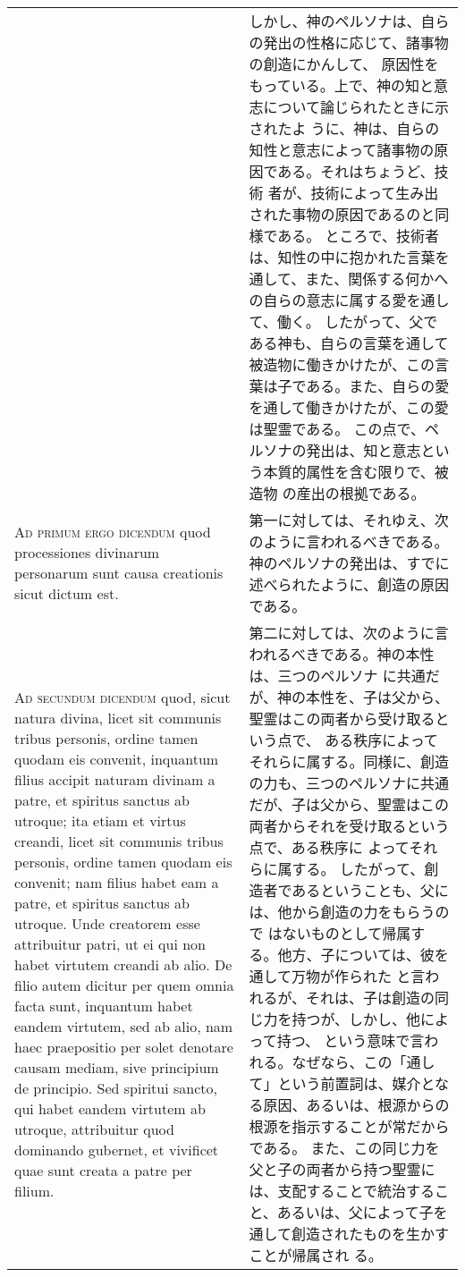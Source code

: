 \documentclass[10pt]{jsarticle} %
\begin{document}
\begin{longtable}{p{21em}p{21em}}
&

しかし、神のペルソナは、自らの発出の性格に応じて、諸事物の創造にかんして、
 原因性をもっている。上で、神の知と意志について論じられたときに示されたよ
 うに、神は、自らの知性と意志によって諸事物の原因である。それはちょうど、技術
 者が、技術によって生み出された事物の原因であるのと同様である。
ところで、技術者は、知性の中に抱かれた言葉を通して、また、関係する何かへ
 の自らの意志に属する愛を通して、働く。
したがって、父である神も、自らの言葉を通して被造物に働きかけたが、この言
 葉は子である。また、自らの愛を通して働きかけたが、この愛は聖霊である。
この点で、ペルソナの発出は、知と意志という本質的属性を含む限りで、被造物
 の産出の根拠である。


\\

{\scshape Ad primum ergo dicendum} quod processiones
divinarum personarum sunt causa creationis sicut dictum est.

&
第一に対しては、それゆえ、次のように言われるべきである。
神のペルソナの発出は、すでに述べられたように、創造の原因である。

\\


{\scshape Ad secundum dicendum} quod, sicut natura
divina, licet sit communis tribus personis, ordine tamen quodam eis
convenit, inquantum filius accipit naturam divinam a patre, et spiritus
sanctus ab utroque; ita etiam et virtus creandi, licet sit communis
tribus personis, ordine tamen quodam eis convenit; nam filius habet eam
a patre, et spiritus sanctus ab utroque. Unde creatorem esse attribuitur
patri, ut ei qui non habet virtutem creandi ab alio. De filio autem
dicitur per quem omnia facta sunt, inquantum habet eandem virtutem, sed
ab alio, nam haec praepositio per solet denotare causam mediam, sive
principium de principio. Sed spiritui sancto, qui habet eandem virtutem
ab utroque, attribuitur quod dominando gubernet, et vivificet quae sunt
creata a patre per filium. 

&

第二に対しては、次のように言われるべきである。神の本性は、三つのペルソナ
に共通だが、神の本性を、子は父から、聖霊はこの両者から受け取るという点で、
ある秩序によってそれらに属する。同様に、創造の力も、三つのペルソナに共通
だが、子は父から、聖霊はこの両者からそれを受け取るという点で、ある秩序に
よってそれらに属する。
したがって、創造者であるということも、父には、他から創造の力をもらうので
 はないものとして帰属する。他方、子については、彼を通して万物が作られた
 と言われるが、それは、子は創造の同じ力を持つが、しかし、他によって持つ、
 という意味で言われる。なぜなら、この「通して」という前置詞は、媒介とな
 る原因、あるいは、根源からの根源を指示することが常だからである。
また、この同じ力を父と子の両者から持つ聖霊には、支配することで統治するこ
 と、あるいは、父によって子を通して創造されたものを生かすことが帰属され
 る。



\end{longtable}
\end{document}
